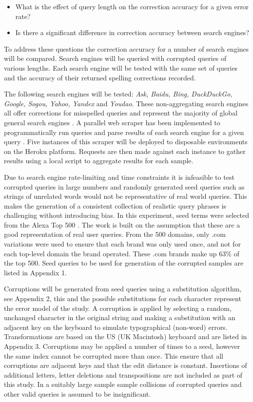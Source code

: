 \documentclass{csfourzero}
\begin{document}
\begin{itemize}
  \item{What is the effect of query length on the correction accuracy for a given error rate?}
  \item{Is there a significant difference in correction accuracy between search engines?}
\end{itemize}

\noindent
To address these questions the correction accuracy for a number of search engines will be compared. Search engines will be queried with corrupted queries of various lengths. Each search engine will be tested with the same set of queries and the accuracy of their returned spelling corrections recorded.

The following search engines will be tested: \textit{Ask, Baidu, Bing, DuckDuckGo, Google, Sogou, Yahoo, Yandex} and \textit{Youdao}. These non-aggregating search engines all offer corrections for misspelled queries and represent the majority of global general search engines \cite{searchenginewiki}. A parallel web scraper has been implemented to programmatically run queries and parse results of each search engine for a given query \cite{scraper}. Five instances of this scraper will be deployed to disposable environments on the Heroku platform. Requests are then made against each instance to gather results using a local script to aggregate results for each sample.

Due to search engine rate-limiting and time constraints it is infeasible to test corrupted queries in large numbers and randomly generated seed queries such as strings of unrelated words would not be representative of real world queries. This makes the generation of a consistent collection of realistic query phrases is challenging without introducing bias. In this experiment, seed terms were selected from the Alexa Top 500 \cite{alexatop500}. The work is built on the assumption that these are a good representation of real user queries. From the 500 domains, only .com variations were used to ensure that each brand was only used once, and not for each top-level domain the brand operated. These .com brands make up 63\% of the top 500. Seed queries to be used for generation of the corrupted samples are listed in Appendix 1.

Corruptions will be generated from seed queries using a substitution algorithm, see Appendix 2, this and the possible substitutions for each character represent the error model of the study. A corruption is applied by selecting a random, unchanged character in the original string and making a substitution with an adjacent key on the keyboard to simulate typographical (non-word) errors. Transformations are based on the US (UK Macintosh) keyboard and are listed in Appendix 3. Corruptions may be applied a number of times to a seed, however the same index cannot be corrupted more than once. This ensure that all corruptions are adjacent keys and that the edit distance is constant. Insertions of additional letters, letter deletions and transpositions are not included as part of this study. In a suitably large sample sample collisions of corrupted queries and other valid queries is assumed to be insignificant.
\end{document}
